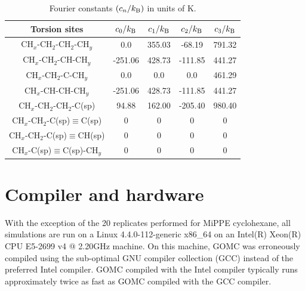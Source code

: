 \documentclass[journal=jctc,manuscript=article]{achemso}
\begin{document}
    \begin{table}[h!]
		\caption{Fourier constants $(c_n/k_{\rm B})$ in units of K.} \label{tab:torsions} %
		\begin{center}
			\begin{tabular}{|c|c|c|c|c|}
				\hline
				Torsion sites & $c_0/k_{\rm B}$ & $c_1/k_{\rm B}$ & $c_2/k_{\rm B}$ & $c_3/k_{\rm B}$ \\ \hline
				CH$_x$-CH$_2$-CH$_2$-CH$_y$ & 0.0 & 355.03 & -68.19 & 791.32 \\ 
				CH$_x$-CH$_2$-CH-CH$_y$ & -251.06 & 428.73 & -111.85 & 441.27 \\
				CH$_x$-CH$_2$-C-CH$_y$ & 0.0 & 0.0 & 0.0 & 461.29 \\
				CH$_x$-CH-CH-CH$_y$ & -251.06 & 428.73 & -111.85 & 441.27 \\
				CH$_x$-CH$_2$-CH$_2$-C(sp) & 94.88 & 162.00 & -205.40 & 980.40 \\
				CH$_x$-CH$_2$-C(sp)$\equiv$C(sp) & 0 & 0 & 0 & 0 \\
				CH$_x$-CH$_2$-C(sp)$\equiv$CH(sp) & 0 & 0 & 0 & 0 \\
				CH$_x$-C(sp)$\equiv$C(sp)-CH$_y$ & 0 & 0 & 0 & 0 \\
				\hline
			\end{tabular}
		\end{center} 
	\end{table}


\newpage
\clearpage

\section{Compiler and hardware} \label{SI sec: Machine hardward}

With the exception of the 20 replicates performed for MiPPE cyclohexane, all simulations are run on a Linux 4.4.0-112-generic x86\_64 on an Intel(R) Xeon(R) CPU E5-2699 v4 @ 2.20GHz machine. On this machine, GOMC was erroneously compiled using the sub-optimal GNU compiler collection (GCC) instead of the preferred Intel compiler. GOMC compiled with the Intel compiler typically runs approximately twice as fast as GOMC compiled with the GCC compiler.
\end{document}
